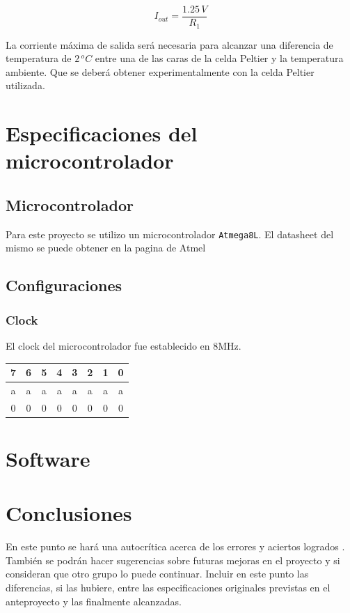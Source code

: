 \documentclass[10pt,spanish,a4paper,openany,notitlepage]{article}
\begin{document}
\begin{equation}
I_{out} = \frac{1.25\, \unit{V}}{R_1}
\label{eq:iout}
\end{equation}
 
La corriente máxima de salida será necesaria para alcanzar una diferencia 
de temperatura de $2\, \unit{^oC}$ entre una de las caras de la celda Peltier 
y la temperatura ambiente. Que se deberá obtener experimentalmente con
la celda Peltier utilizada.

\section{Especificaciones del microcontrolador}

\subsection{Microcontrolador}
Para este proyecto se utilizo un microcontrolador \texttt{Atmega8L}. El datasheet del mismo se puede obtener en la pagina de Atmel\cite{datasheet}
\subsection{Configuraciones}
\subsubsection{Clock}
El clock del microcontrolador fue establecido en 8MHz. 
\begin{center}
\begin{tabular}{|c|c|c|c|c|c|c|c|}\hline
7&6&5&4&3&2&1&0\\\hline
a&a&a&a&a&a&a&a\\\hline
0&0&0&0&0&0&0&0\\\hline
\end{tabular}
\end{center}

\section{Software}


\section{Conclusiones}

En este punto se hará una autocrítica acerca de los errores y aciertos logrados . También se podrán  hacer sugerencias sobre futuras mejoras en el proyecto y si consideran que otro grupo lo puede continuar. Incluir en este punto las diferencias, si las hubiere, entre las especificaciones originales previstas en el anteproyecto y las finalmente alcanzadas.
\end{document}
